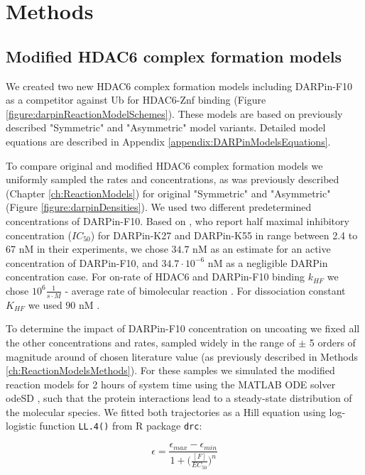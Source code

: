 \section{Methods}

\subsection{Modified HDAC6 complex formation models}

We created two new HDAC6 complex formation models including DARPin-F10 as a competitor against Ub for HDAC6-Znf binding (Figure \ref{figure:darpinReactionModelSchemes}). These models are based on previously described "Symmetric" and "Asymmetric" model variants. Detailed model equations are described in Appendix \ref{appendix:DARPinModelsEquations}.

To compare original and modified HDAC6 complex formation models we uniformly sampled the rates and concentrations, as was previously described (Chapter \ref{ch:ReactionModels}) for original "Symmetric" and "Asymmetric" (Figure \ref{figure:darpinDensities}). We used two different predetermined concentrations of DARPin-F10. Based on \cite{guillard2017structural}, who report half maximal inhibitory concentration ($IC_{50}$) for DARPin-K27 and DARPin-K55 in range between 2.4 to 67 nM in their experiments, we chose $34.7$ nM as an estimate for an active concentration of DARPin-F10, and  $34.7 \cdot 10^{-6}$ nM as a negligible DARPin concentration case. For on-rate of HDAC6 and DARPin-F10 binding $k_{HF}$ we chose $10^{6} \frac{1}{s\cdot M}$ - average rate of bimolecular reaction \cite{bionumbersbimolrate}. For dissociation constant $K_{HF}$ we used $90$ nM \cite{DarpinData}.

To determine the impact of DARPin-F10 concentration on uncoating we fixed all the other concentrations and rates, sampled widely in the range of $\pm$ 5 orders of magnitude around of chosen literature value (as previously described in Methods \ref{ch:ReactionModelsMethods}). For these samples we simulated the modified reaction models for 2 hours of system time using the MATLAB ODE solver odeSD \cite{gonnet2012specialized}, such that the protein interactions lead to a steady-state distribution of the molecular species. We fitted both trajectories as a Hill equation using log-logistic function \texttt{LL.4()} from R package \texttt{drc}:

\begin{equation}
\epsilon=\frac{\epsilon_{max} - \epsilon_{min}}{1 + \big(\frac{[F]}{EC_{50}}\big)^n}
\end{equation}

